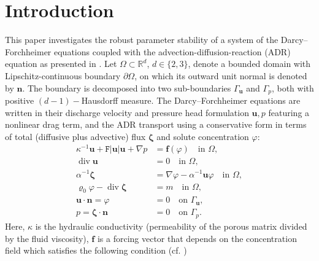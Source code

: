 \documentclass[11pt, reqno, a4paper, twoside]{article}
\newcommand{\bn}{\boldsymbol{n}}
\newcommand{\bu}{\boldsymbol{u}}
\renewcommand{\bf}{\boldsymbol{f}}
\newcommand{\bx}{\boldsymbol{x}}
\newcommand\bzeta{\boldsymbol{\zeta}}
\newcommand\bzero{\boldsymbol{0}}
\newcommand{\rF}{\mathtt{F}}
\newcommand{\bL}{\mathbf{L}}
\newcommand\vdiv{\mathop{\mathrm{div}}\nolimits}
\numberwithin{equation}{section}
\numberwithin{remark}{section}
\numberwithin{figure}{section}
\numberwithin{table}{section}
\begin{document}
\section{Introduction} 
This paper investigates the robust parameter stability of a system of the Darcy--Forchheimer equations coupled with the advection-diffusion-reaction (ADR) equation as presented in \cite{sayah2021finite}.  
  Let $\Omega\subset \mathbb{R}^d$, $d\in \{2,3\}$, denote a  {bounded} domain with Lipschitz-continuous boundary $\partial\Omega$, on which its outward unit normal  is
denoted by $\bn$.  The boundary is decomposed into  two sub-boundaries $\Gamma_{\bu}$ and $\Gamma_p$, both with positive $(d-1)-$Hausdorff measure. The Darcy--Forchheimer equations are written in their discharge velocity and pressure head formulation $\bu,p$ featuring a nonlinear drag term, and the ADR transport using a conservative form in terms of total (diffusive plus advective) flux  $\bzeta$ and solute concentration  $\varphi$: 
\begin{subequations}\label{eq:strong}
\begin{align}
    \kappa^{-1}\bu + {\rF|\bu|\bu} + \nabla p & = \bf(\varphi) \quad \text{in $\Omega$},\\
    \vdiv \bu & = 0 \quad \text{in $\Omega$},\\
    \alpha^{-1}\bzeta & = \nabla \varphi - { \alpha^{-1}} \bu \varphi \quad \text{in $\Omega$},\\
    \varrho_0 \varphi - \vdiv \bzeta & = m \quad \text{in $\Omega$},\\
    \bu\cdot \bn = \varphi & = 0 \quad \text{on $\Gamma_{\bu}$},\\
    p  = \bzeta \cdot \bn  & = 0 \quad \text{on $\Gamma_p$}.
\end{align}\end{subequations}
Here, $\kappa$ is the hydraulic conductivity (permeability of the porous matrix divided by the fluid viscosity),
$\bf$ is a forcing vector that depends on the concentration field which satisfies the following condition (cf. \cite[Assumption~2.1]{sayah2021finite}) 
\end{document}
